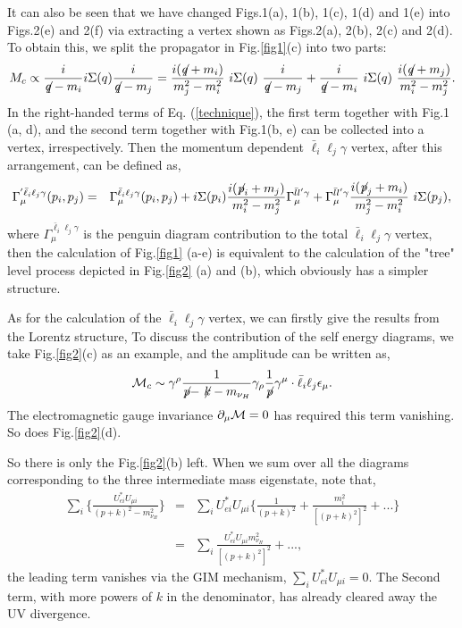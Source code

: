 \documentclass[preprint,aps,12pt,showpacs,nofootinbib,tightenlines]{revtex4}
\def\q_slash{\not{\hbox{\kern-2.1pt $q$}}}
\def\p_slash{\not{\hbox{\kern-2.1pt $p$}}}
\def\k_slash{\not{\hbox{\kern-2.1pt $k$}}}
\newcommand{\beq}{\begin{equation}}
\newcommand{\eeq}{\end{equation}}
\newcommand{\bea}{\begin{eqnarray}}
\newcommand{\eea}{\end{eqnarray}}
\begin{document}
It can also be seen that we have changed  Figs.1(a), 1(b), 1(c), 1(d) and 1(e) into Figs.2(e) and 2(f) via extracting a vertex shown as Figs.2(a), 2(b), 2(c) and 2(d)\cite{0702264}. To obtain this, we split the propagator in Fig.\ref{fig1}(c)
into two parts:
\begin{eqnarray}
M_c  \propto \frac{i} {\q_slash - m_i} i \Sigma(q)
\frac{i}{\q_slash - m_j} = \frac{i (\q_slash + m_i )}{m_j^2 -
m_i^2} \ i \Sigma(q) \ \frac{i}{\q_slash - m_j} +
 \frac{i}{\q_slash- m_i} \ i \Sigma (q) \  \frac{i (\q_slash + m_j)}{m_i^2 -
 m_j^2}.   \label{technique}
\end{eqnarray}
In the right-handed terms of Eq. (\ref{technique}), the first term together with Fig.1 (a, d),
and the second term together with Fig.1(b, e) can be collected into a vertex, irrespectively.
Then the momentum dependent $\bar \ell_i \ell_j \gamma$ vertex, after this arrangement, can be
defined as,
\begin{eqnarray}
\Gamma^{'\bar \ell_i \ell_j \gamma}_{\mu} (p_i, p_j) &= & \Gamma_\mu^{\bar \ell_i \ell_j \gamma}
(p_i,p_j) + i \Sigma (p_i)   \frac{i (\p_slash_i + m_j)}{m_i^2 -
m_j^2} \Gamma_\mu^{\bar{l}l' \gamma} + \Gamma_\mu^{\bar{l}l'\gamma} \frac{i
(\p_slash_j + m_i )}{m_j^2 - m_i^2} \ i \Sigma(p_j), \label{eff}
\end{eqnarray}
where $\Gamma_\mu^{\bar \ell_i \ell_j\gamma} $ is the penguin diagram
contribution to the total $\bar \ell_i \ell_j \gamma$ vertex,
then the calculation of Fig.\ref{fig1} (a-e) is
equivalent to the calculation of the "tree" level process
depicted in Fig.\ref{fig2} (a) and (b), which obviously has a
simpler structure.

As for the calculation of the $\bar \ell_i \ell_j \gamma$ vertex, we can firstly give the results from the Lorentz structure,
To discuss the contribution of the self energy diagrams, we take Fig.\ref{fig2}(c) as an example, and
 the amplitude can be written as,
 \beq
 {\cal M}_c \sim \gamma^\rho \frac{1}{\p_slash-\k_slash-m_{\nu_H}}\gamma_\rho \frac{1}{\p_slash} \gamma^\mu
 \cdot \bar \ell_i \ell_j \epsilon_\mu.
 \eeq
 The electromagnetic gauge invariance $\partial_\mu {\cal M}=0$ has required this term vanishing. So does Fig.\ref{fig2}(d).

So there is only the Fig.\ref{fig2}(b) left. When we sum over all the diagrams corresponding to the three intermediate mass
eigenstate, note that,
\bea
\sum\limits_i\{\frac{ U^*_{ei}U_{\mu i}}{(p+k)^2-m^2_{\nu_H}}\}
&=& \nonumber
\sum\limits_i U^*_{ei}U_{\mu i}\{ \frac{1}{(p+k)^2}+\frac{m_i^2}{[(p+k)^2]^2} +...\} \\
&=&\sum\limits_i\frac{  U^*_{ei}U_{\mu i}m^2_{\nu_H}} {[(p+k)^2]^2 }+...,
\eea
the leading term vanishes via the GIM mechanism, $\sum\limits_i U^*_{ei}U_{\mu i}=0.$ The Second term, with more
powers of $k$ in the denominator, has already cleared away the UV divergence.
\end{document}
